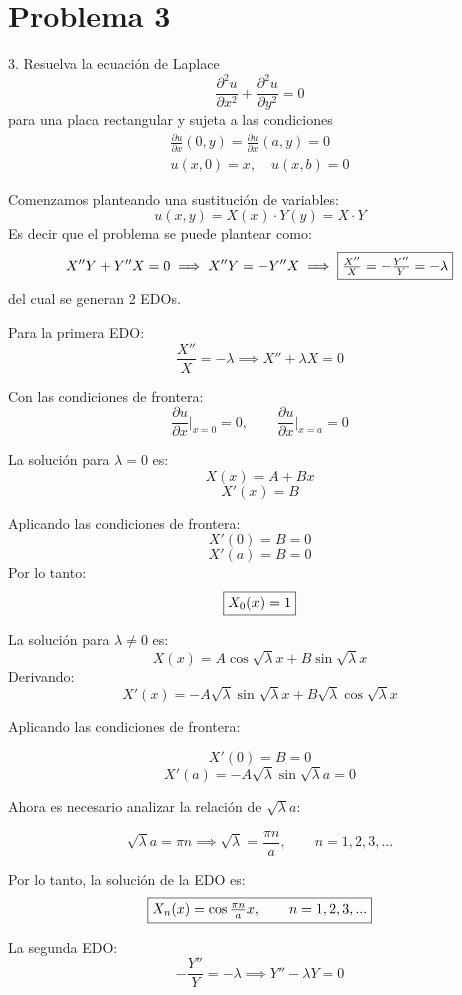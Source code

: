 
\section{Problema 3}
3. Resuelva la ecuación de Laplace
$$
\frac{\partial^{2} u}{\partial x^{2}}+\frac{\partial^{2} u}{\partial y^{2}}=0
$$
para una placa rectangular y sujeta a las condiciones
$$
\begin{array}{c}
\frac{\partial u}{\partial x}(0, y)=\frac{\partial u}{\partial x}(a, y)=0 \\
u(x, 0)=x, \quad u(x, b)=0
\end{array}
$$

\begin{solution}
Comenzamos planteando una sustitución de variables:
$$u(x,y)=X(x)\cdot Y(y) = X\cdot Y$$
Es decir que el problema se puede plantear como: 
$$X''Y+Y''X=0\implies X''Y=-Y''X\implies \fbox{$\frac{X''}{X}=-\frac{Y''}{Y}=-\lambda$}$$
del cual se generan 2 EDOs. 

\linea 

Para la primera EDO: 
$$\frac{X''}{X}=-\lambda\implies X''+\lambda X=0$$

Con las condiciones de frontera: 
$$\frac{\partial u}{\partial x}\Big |_{x=0}=0, \qquad \frac{\partial u}{\partial x}\Big |_{x=a}=0$$

\linita

La solución para $\lambda=0$ es: 
$$X(x)= A+Bx$$
$$X'(x)= B$$

Aplicando las condiciones de frontera: 
$$X'(0)=B=0$$
$$X'(a)=B=0$$
Por lo tanto: 
$$\fbox{$X_0(x)=1$}$$


\linita 

La solución para $\lambda\neq0$ es: 
$$X(x)=A\cos\sqrt{\lambda}x+B\sin\sqrt{\lambda}x$$
Derivando: 
$$X'(x)=-A\sqrt{\lambda}\sin\sqrt{\lambda}x+B\sqrt{\lambda}\cos\sqrt{\lambda}x$$

Aplicando las condiciones de frontera: 

$$X'(0)= B=0$$
$$X'(a)= -A\sqrt{\lambda}\sin\sqrt{\lambda}a=0$$

Ahora es necesario analizar la relación de $\sqrt{\lambda}a$: 

$$\sqrt{\lambda}a=\pi n \implies \sqrt{\lambda}=\frac{\pi n}{a}, \qquad n=1,2,3,...$$

Por lo tanto, la solución de la EDO es: 
$$\fbox{$X_n(x)=\cos\frac{\pi n}{a}x,\qquad n=1,2,3,...$}$$

\linea 

La segunda EDO: 
$$-\frac{Y''}{Y}=-\lambda\implies Y''-\lambda Y=0$$


\end{solution}
